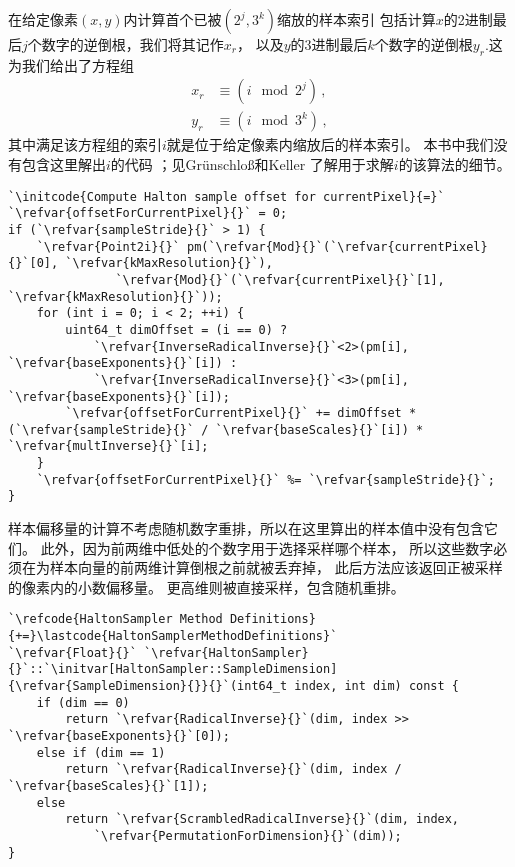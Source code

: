 在给定像素$(x,y)$内计算首个已被$(2^j,3^k)$缩放的样本索引
包括计算$x$的2进制最后$j$个数字的逆倒根，我们将其记作$x_r$，
以及$y$的3进制最后$k$个数字的逆倒根$y_r$.这为我们给出了方程组
\begin{align*}
    x_r & \equiv(i \mod 2^j)\, , \\
    y_r & \equiv(i \mod 3^k)\, ,
\end{align*}
其中满足该方程组的索引$i$就是位于给定像素内缩放后的样本索引。
本书中我们没有包含这里解出$i$的代码{}
；见Gr\"{u}nschlo\ss{}和Keller \parencite*{10.1007/978-3-642-04107-5_25}
了解用于求解$i$的该算法的细节。
\begin{lstlisting}
`\initcode{Compute Halton sample offset for currentPixel}{=}`
`\refvar{offsetForCurrentPixel}{}` = 0;
if (`\refvar{sampleStride}{}` > 1) {
    `\refvar{Point2i}{}` pm(`\refvar{Mod}{}`(`\refvar{currentPixel}{}`[0], `\refvar{kMaxResolution}{}`),
               `\refvar{Mod}{}`(`\refvar{currentPixel}{}`[1], `\refvar{kMaxResolution}{}`));
    for (int i = 0; i < 2; ++i) {
        uint64_t dimOffset = (i == 0) ?
            `\refvar{InverseRadicalInverse}{}`<2>(pm[i], `\refvar{baseExponents}{}`[i]) :
            `\refvar{InverseRadicalInverse}{}`<3>(pm[i], `\refvar{baseExponents}{}`[i]);
        `\refvar{offsetForCurrentPixel}{}` += dimOffset * (`\refvar{sampleStride}{}` / `\refvar{baseScales}{}`[i]) * `\refvar{multInverse}{}`[i];
    }
    `\refvar{offsetForCurrentPixel}{}` %= `\refvar{sampleStride}{}`;
}
\end{lstlisting}

样本偏移量的计算不考虑随机数字重排，所以在这里算出的样本值中没有包含它们。
此外，因为前两维中低处的个数字用于选择采样哪个样本，
所以这些数字必须在为样本向量的前两维计算倒根之前就被丢弃掉，
此后方法应该返回正被采样的像素内的小数偏移量。
更高维则被直接采样，包含随机重排。
\begin{lstlisting}
`\refcode{HaltonSampler Method Definitions}{+=}\lastcode{HaltonSamplerMethodDefinitions}`
`\refvar{Float}{}` `\refvar{HaltonSampler}{}`::`\initvar[HaltonSampler::SampleDimension]{\refvar{SampleDimension}{}}{}`(int64_t index, int dim) const {
    if (dim == 0)
        return `\refvar{RadicalInverse}{}`(dim, index >> `\refvar{baseExponents}{}`[0]);
    else if (dim == 1)
        return `\refvar{RadicalInverse}{}`(dim, index / `\refvar{baseScales}{}`[1]);
    else
        return `\refvar{ScrambledRadicalInverse}{}`(dim, index,
            `\refvar{PermutationForDimension}{}`(dim));
}
\end{lstlisting}